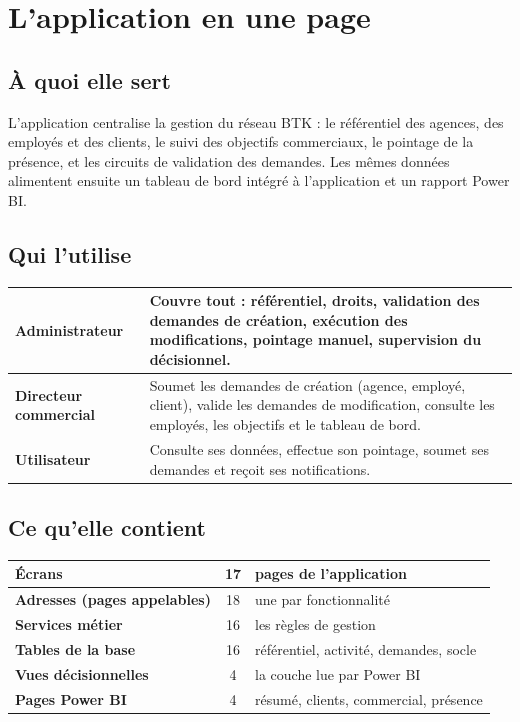 \documentclass[a4paper,11pt]{article}
\begin{document}
\tableofcontents
\newpage

\section{L'application en une page}

\subsection{À quoi elle sert}

L'application centralise la gestion du réseau BTK : le référentiel des agences,
des employés et des clients, le suivi des objectifs commerciaux, le pointage de
la présence, et les circuits de validation des demandes. Les mêmes données
alimentent ensuite un tableau de bord intégré à l'application et un rapport
Power BI.

\subsection{Qui l'utilise}

\noindent\begin{tabularx}{\textwidth}{|>{\bfseries}L{3.6cm}|X|}
\hline
Administrateur & Couvre tout : référentiel, droits, validation des demandes de création, exécution des modifications, pointage manuel, supervision du décisionnel.\\
\hline
Directeur commercial & Soumet les demandes de création (agence, employé, client), valide les demandes de modification, consulte les employés, les objectifs et le tableau de bord.\\
\hline
Utilisateur & Consulte ses données, effectue son pointage, soumet ses demandes et reçoit ses notifications.\\
\hline
\end{tabularx}

\subsection{Ce qu'elle contient}

\noindent\begin{tabularx}{\textwidth}{|>{\bfseries}L{4.4cm}|c|X|}
\hline
Écrans & 17 & pages de l'application\\
\hline
Adresses (pages appelables) & 18 & une par fonctionnalité\\
\hline
Services métier & 16 & les règles de gestion\\
\hline
Tables de la base & 16 & référentiel, activité, demandes, socle\\
\hline
Vues décisionnelles & 4 & la couche lue par Power BI\\
\hline
Pages Power BI & 4 & résumé, clients, commercial, présence\\
\hline
\end{tabularx}
\end{document}
